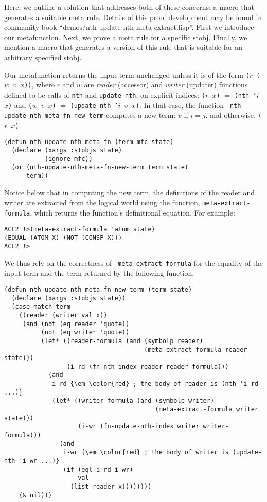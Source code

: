 Here, we outline a solution that addresses both of these concerns: a
macro that generates a suitable meta rule.  Details of this proof
development may be found in community book
``demos/\allowbreak{}nth-update-nth-meta-extract.lisp''.
First we introduce our metafunction.  Next, we prove a meta rule for a
specific stobj.  Finally, we mention a macro that generates a version
of this rule that is suitable for an arbitrary specified stobj.

Our metafunction returns the input term unchanged unless it is of the
form {\tt ($r$ ($w$ $v$ $x$))}, where $r$ and $w$ are {\em reader}
(accessor) and {\em writer} (updater) functions defined to be calls of
{\tt nth} and {\tt update-nth}, on explicit indices: {\tt ($r$ $x$)}
$=$ {\tt (nth '$i$ $x$)} and {\tt ($w$ $v$ $x$)} $=$ {\tt (update-nth
  '$i$ $v$ $x$)}.  In that case, the function {\tt
  nth-update-nth-meta-fn-new-term} computes a new term: $v$ if $i =
j$, and otherwise, {\tt ($r$ $x$)}.

\begin{verbatim}
(defun nth-update-nth-meta-fn (term mfc state)
  (declare (xargs :stobjs state)
           (ignore mfc))
  (or (nth-update-nth-meta-fn-new-term term state)
      term))
\end{verbatim}

Notice below that in computing the new term, the definitions of the
reader and writer are extracted from the logical world using the
function, {\tt meta-extract-formula}, which returns the function's
definitional equation.  For example:

\begin{verbatim}
ACL2 !>(meta-extract-formula 'atom state)
(EQUAL (ATOM X) (NOT (CONSP X)))
ACL2 !>
\end{verbatim}

\noindent We thus rely on the correctness of {\tt
  meta-extract-formula} for the equality of the input term and the
term returned by the following function.

\begin{Verbatim}[commandchars=\\\{\},fontsize=\small]
(defun nth-update-nth-meta-fn-new-term (term state)
  (declare (xargs :stobjs state))
  (case-match term
    ((reader (writer val x))
     (and (not (eq reader 'quote))
          (not (eq writer 'quote))
          (let* ((reader-formula (and (symbolp reader)
                                      (meta-extract-formula reader state)))
                 (i-rd (fn-nth-index reader reader-formula)))
            (and
             i-rd {\em \color{red} ; the body of reader is (nth 'i-rd ...)}
             (let* ((writer-formula (and (symbolp writer)
                                         (meta-extract-formula writer state)))
                    (i-wr (fn-update-nth-index writer writer-formula)))
               (and
                i-wr {\em \color{red} ; the body of writer is (update-nth 'i-wr ...)}
                (if (eql i-rd i-wr)
                    val
                  (list reader x))))))))
    (& nil)))
\end{Verbatim}

